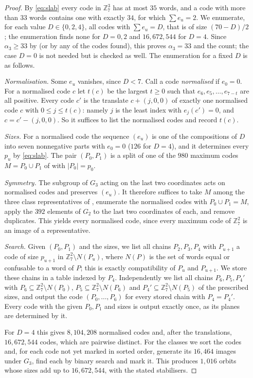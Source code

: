 \documentclass[11pt,colorlinks]{charlie}
\newcommand{\Zs}{\mathbb{Z}_7}
\begin{document}
\begin{proof}
By \eqref{eq:slab} every code in $\Zs^3$ has at most $35$ words, and a code with more than $33$ words contains one with exactly $34$, for which $\sum e_u=2$. We enumerate, for each value $D\in\{0,2,4\}$, all codes with $\sum e_u=D$, that is of size $(70-D)/2$; the enumeration finds none for $D=0,2$ and $16{,}672{,}544$ for $D=4$. Since $\alpha_3\ge33$ by \cite{BBC} (or by any of the codes found), this proves $\alpha_3=33$ and the count; the case $D=0$ is not needed but is checked as well. The enumeration for a fixed $D$ is as follows.

\emph{Normalisation.} Some $e_u$ vanishes, since $D<7$. Call a code \emph{normalised} if $e_0=0$. For a normalised code $c$ let $t(c)$ be the largest $t\ge0$ such that $e_6,e_5,\dots,e_{7-t}$ are all positive. Every code $c'$ is the translate $c+(j,0,0)$ of exactly one normalised code $c$ with $0\le j\le t(c)$: namely $j$ is the least index with $e_j(c')=0$, and $c=c'-(j,0,0)$. So it suffices to list the normalised codes and record $t(c)$.

\emph{Sizes.} For a normalised code the sequence $(e_u)$ is one of the compositions of $D$ into seven nonnegative parts with $e_0=0$ ($126$ for $D=4$), and it determines every $p_u$ by \eqref{eq:slab}. The pair $(P_0,P_1)$ is a split of one of the $980$ maximum codes $M=P_0\cup P_1$ of  with $|P_0|=p_0$.

\emph{Symmetry.} The subgroup of $G_3$ acting on the last two coordinates acts on normalised codes and preserves $(e_u)$. It therefore suffices to take $M$ among the three class representatives of , enumerate the normalised codes with $P_0\cup P_1=M$, apply the $392$ elements of $G_2$ to the last two coordinates of each, and remove duplicates. This yields every normalised code, since every maximum code of $\Zs^2$ is an image of a representative.

\emph{Search.} Given $(P_0,P_1)$ and the sizes, we list all chains $P_2,P_3,P_4$ with $P_{u+1}$ a code of size $p_{u+1}$ in $\Zs^2\setminus N(P_u)$, where $N(P)$ is the set of words equal or confusable to a word of $P$; this is exactly compatibility of $P_u$ and $P_{u+1}$. We store these chains in a table indexed by $P_4$. Independently we list all chains $P_6,P_5,P_4'$ with $P_6\subseteq\Zs^2\setminus N(P_0)$, $P_5\subseteq\Zs^2\setminus N(P_6)$ and $P_4'\subseteq\Zs^2\setminus N(P_5)$ of the prescribed sizes, and output the code $(P_0,\dots,P_6)$ for every stored chain with $P_4=P_4'$. Every code with the given $P_0,P_1$ and sizes is output exactly once, as its planes are determined by it.

For $D=4$ this gives $8{,}104{,}208$ normalised codes and, after the translations, $16{,}672{,}544$ codes, which are pairwise distinct. For the classes we sort the codes and, for each code not yet marked in sorted order, generate its $16{,}464$ images under $G_3$, find each by binary search and mark it. This produces $1{,}016$ orbits whose sizes add up to $16{,}672{,}544$, with the stated stabilisers.
\end{proof}
\end{document}
